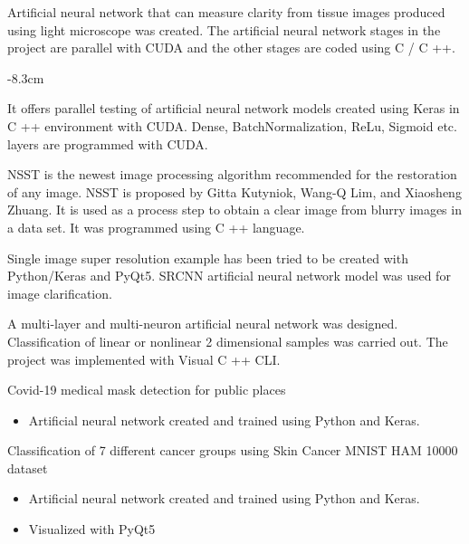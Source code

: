 \documentclass[10pt,a4paper]{altacv}
\begin{document}
 {}

Artificial neural network that can measure clarity from tissue images produced using light microscope was created. The artificial neural network stages in the project are parallel with CUDA and the other stages are coded using C / C ++.

\divider

\smallskip


\begin{adjustwidth}{}{-8.3cm}

It offers parallel testing of artificial neural network models created using Keras in C ++ environment with CUDA. Dense, BatchNormalization, ReLu, Sigmoid etc. layers are programmed with CUDA.

\divider

NSST is the newest image processing algorithm recommended for the restoration of any image. NSST is proposed by Gitta Kutyniok, Wang-Q Lim, and Xiaosheng Zhuang. It is used as a process step to obtain a clear image from blurry images in a data set. It was programmed using C ++ language.

\divider

Single image super resolution example has been tried to be created with Python/Keras and PyQt5. SRCNN artificial neural network model was used for image clarification.

\divider

A multi-layer and multi-neuron artificial neural network was designed. Classification of linear or nonlinear 2 dimensional samples was carried out. The project was implemented with Visual C ++ CLI.

\divider

Covid-19 medical mask detection for public places
\begin{itemize}
    \item Artificial neural network created and trained using Python and Keras.
\end{itemize}

\divider

Classification of 7 different cancer groups using Skin Cancer MNIST HAM 10000 dataset
\begin{itemize}
    \item Artificial neural network created and trained using Python and Keras.
    \item Visualized with PyQt5
\end{itemize}


\end{adjustwidth}
\end{document}
